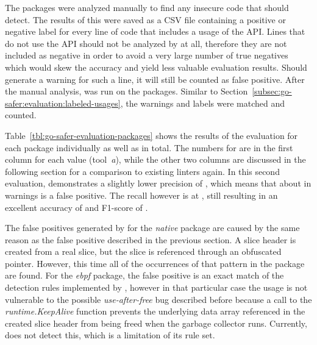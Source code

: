 

The  packages were analyzed manually to find any insecure code that \toolSafer{} should detect.
The results of this were saved as a \acrshort{CSV} file containing a positive or negative label for every line of code
that includes a usage of the \unsafe{} \acrshort{API}.
Lines that do not use the \acrshort{API} should not be analyzed by \toolSafer{} at all, therefore they are not included
as negative in order to avoid a very large number of true negatives which would skew the accuracy and yield less
valuable evaluation results.
Should \toolSafer{} generate a warning for such a line, it will still be counted as false positive.
After the manual analysis, \toolSafer{} was run on the packages.
Similar to Section~\ref{subsec:go-safer:evaluation:labeled-usages}, the warnings and labels were matched and counted.



Table~\ref{tbl:go-safer-evaluation-packages} shows the results of the evaluation for each package individually as well
as in total.
The numbers for \toolSafer{} are in the first column for each value (tool~\textit{a}), while the other two columns are
discussed in the following section for a comparison to existing linters again.
In this second evaluation, \toolSafer{} demonstrates a slightly lower precision of , which means that
about  in  warnings is a false positive.
The recall however is at , still resulting in an excellent accuracy of  and F1-score of
.

The false positives generated by \toolSafer{} for the \textit{native} package are caused by the same reason as the false
positive described in the previous section.
A slice header is created from a real slice, but the slice is referenced through an obfuscated pointer.
However, this time all of the occurrences of that pattern in the package are found.
For the \textit{ebpf} package, the false positive is an exact match of the detection rules implemented by \toolSafer{},
however in that particular case the usage is not vulnerable to the possible \textit{use-after-free} bug described before
because a call to the \textit{runtime.KeepAlive} function prevents the underlying data array referenced in the created
slice header from being freed when the garbage collector runs.
Currently, \toolSafer{} does not detect this, which is a limitation of its rule set.

